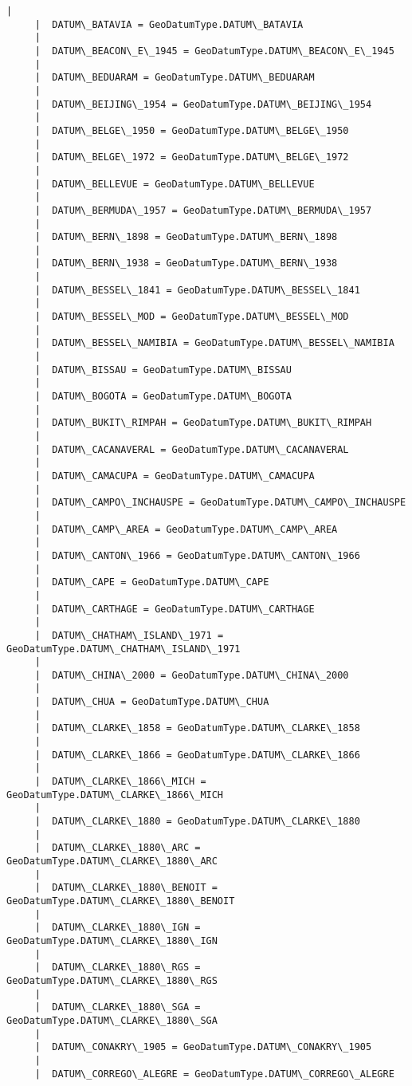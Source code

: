 \documentclass[11pt]{article}
\begin{document}
\begin{Verbatim}[commandchars=\\\{\}]
     |  
     |  DATUM\_BATAVIA = GeoDatumType.DATUM\_BATAVIA
     |  
     |  DATUM\_BEACON\_E\_1945 = GeoDatumType.DATUM\_BEACON\_E\_1945
     |  
     |  DATUM\_BEDUARAM = GeoDatumType.DATUM\_BEDUARAM
     |  
     |  DATUM\_BEIJING\_1954 = GeoDatumType.DATUM\_BEIJING\_1954
     |  
     |  DATUM\_BELGE\_1950 = GeoDatumType.DATUM\_BELGE\_1950
     |  
     |  DATUM\_BELGE\_1972 = GeoDatumType.DATUM\_BELGE\_1972
     |  
     |  DATUM\_BELLEVUE = GeoDatumType.DATUM\_BELLEVUE
     |  
     |  DATUM\_BERMUDA\_1957 = GeoDatumType.DATUM\_BERMUDA\_1957
     |  
     |  DATUM\_BERN\_1898 = GeoDatumType.DATUM\_BERN\_1898
     |  
     |  DATUM\_BERN\_1938 = GeoDatumType.DATUM\_BERN\_1938
     |  
     |  DATUM\_BESSEL\_1841 = GeoDatumType.DATUM\_BESSEL\_1841
     |  
     |  DATUM\_BESSEL\_MOD = GeoDatumType.DATUM\_BESSEL\_MOD
     |  
     |  DATUM\_BESSEL\_NAMIBIA = GeoDatumType.DATUM\_BESSEL\_NAMIBIA
     |  
     |  DATUM\_BISSAU = GeoDatumType.DATUM\_BISSAU
     |  
     |  DATUM\_BOGOTA = GeoDatumType.DATUM\_BOGOTA
     |  
     |  DATUM\_BUKIT\_RIMPAH = GeoDatumType.DATUM\_BUKIT\_RIMPAH
     |  
     |  DATUM\_CACANAVERAL = GeoDatumType.DATUM\_CACANAVERAL
     |  
     |  DATUM\_CAMACUPA = GeoDatumType.DATUM\_CAMACUPA
     |  
     |  DATUM\_CAMPO\_INCHAUSPE = GeoDatumType.DATUM\_CAMPO\_INCHAUSPE
     |  
     |  DATUM\_CAMP\_AREA = GeoDatumType.DATUM\_CAMP\_AREA
     |  
     |  DATUM\_CANTON\_1966 = GeoDatumType.DATUM\_CANTON\_1966
     |  
     |  DATUM\_CAPE = GeoDatumType.DATUM\_CAPE
     |  
     |  DATUM\_CARTHAGE = GeoDatumType.DATUM\_CARTHAGE
     |  
     |  DATUM\_CHATHAM\_ISLAND\_1971 = GeoDatumType.DATUM\_CHATHAM\_ISLAND\_1971
     |  
     |  DATUM\_CHINA\_2000 = GeoDatumType.DATUM\_CHINA\_2000
     |  
     |  DATUM\_CHUA = GeoDatumType.DATUM\_CHUA
     |  
     |  DATUM\_CLARKE\_1858 = GeoDatumType.DATUM\_CLARKE\_1858
     |  
     |  DATUM\_CLARKE\_1866 = GeoDatumType.DATUM\_CLARKE\_1866
     |  
     |  DATUM\_CLARKE\_1866\_MICH = GeoDatumType.DATUM\_CLARKE\_1866\_MICH
     |  
     |  DATUM\_CLARKE\_1880 = GeoDatumType.DATUM\_CLARKE\_1880
     |  
     |  DATUM\_CLARKE\_1880\_ARC = GeoDatumType.DATUM\_CLARKE\_1880\_ARC
     |  
     |  DATUM\_CLARKE\_1880\_BENOIT = GeoDatumType.DATUM\_CLARKE\_1880\_BENOIT
     |  
     |  DATUM\_CLARKE\_1880\_IGN = GeoDatumType.DATUM\_CLARKE\_1880\_IGN
     |  
     |  DATUM\_CLARKE\_1880\_RGS = GeoDatumType.DATUM\_CLARKE\_1880\_RGS
     |  
     |  DATUM\_CLARKE\_1880\_SGA = GeoDatumType.DATUM\_CLARKE\_1880\_SGA
     |  
     |  DATUM\_CONAKRY\_1905 = GeoDatumType.DATUM\_CONAKRY\_1905
     |  
     |  DATUM\_CORREGO\_ALEGRE = GeoDatumType.DATUM\_CORREGO\_ALEGRE

\end{Verbatim}
\end{document}
